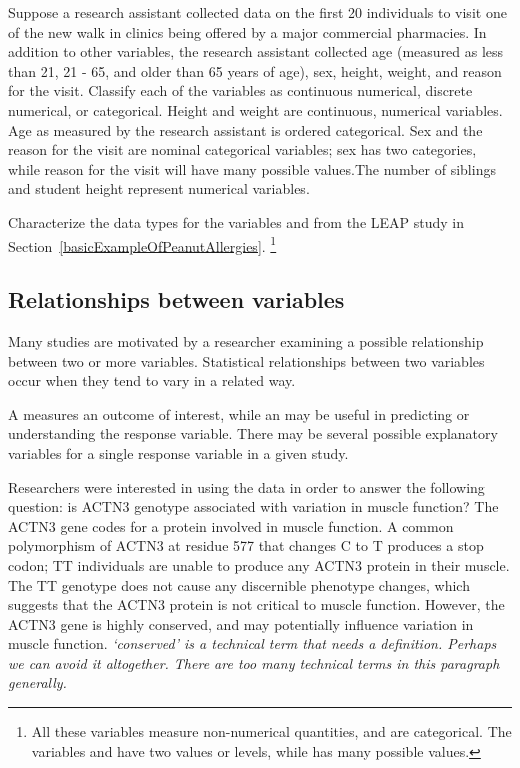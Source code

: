 \begin{doublespace}
\begin{example}{Suppose a research assistant collected data on the first 20 individuals to visit one of the new walk in clinics being offered by a major commercial pharmacies.  In addition to other variables, the research assistant collected age (measured as less than 21, 21 - 65, and older than 65 years of age), sex, height, weight, and reason for the visit.  Classify each of the variables as continuous numerical, discrete numerical, or categorical.}
Height and weight are continuous, numerical variables. Age as  measured by the research assistant is ordered categorical. Sex and the reason for the visit are nominal categorical variables; sex has two categories, while reason for the visit will have many possible values.The number of siblings and student height represent numerical variables. 
\end{example}


\begin{exercise} 
Characterize the data types for the variables   and  from the LEAP study in Section~\ref{basicExampleOfPeanutAllergies}.  \footnote{All these variables measure non-numerical quantities, and are categorical. The variables    and  have two values or levels, while  has many possible values.}
\end{exercise}

\subsection{Relationships between variables}
\label{variableRelations}

Many studies are motivated by a researcher examining a possible relationship between two or more variables. Statistical relationships between two variables occur when they tend to vary in a related way.

A  measures an outcome of interest, while an  may be useful in predicting or understanding the response variable. There may be several possible explanatory variables for a single response variable in a given study.

Researchers were interested in using the  data in order to answer the following question: is ACTN3 genotype associated with variation in muscle function? The ACTN3 gene codes for a protein involved in muscle function. A common polymorphism of ACTN3 at residue 577 that changes C to T produces a stop codon; TT individuals are unable to produce any ACTN3 protein in their muscle. The TT genotype does not cause any discernible phenotype changes, which suggests that the ACTN3 protein is not critical to muscle function. However, the ACTN3 gene is highly conserved, and may potentially influence variation in muscle function.  \textit{`conserved' is a technical term that needs a definition.  Perhaps we can avoid it altogether.  There are too many technical terms in this paragraph generally.}


\end{doublespace}
